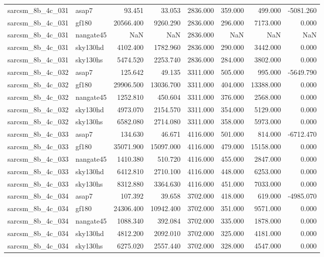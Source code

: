 \begin{tabular}{llrrrrrr}
sarcsm\_8b\_4c\_031 & asap7 & 93.451 & 33.053 & 2836.000 & 359.000 & 499.000 & -5081.260 \\
sarcsm\_8b\_4c\_031 & gf180 & 20566.400 & 9260.290 & 2836.000 & 296.000 & 7173.000 & 0.000 \\
sarcsm\_8b\_4c\_031 & nangate45 & NaN & NaN & 2836.000 & NaN & NaN & NaN \\
sarcsm\_8b\_4c\_031 & sky130hd & 4102.400 & 1782.960 & 2836.000 & 290.000 & 3442.000 & 0.000 \\
sarcsm\_8b\_4c\_031 & sky130hs & 5474.520 & 2253.740 & 2836.000 & 284.000 & 3802.000 & 0.000 \\
sarcsm\_8b\_4c\_032 & asap7 & 125.642 & 49.135 & 3311.000 & 505.000 & 995.000 & -5649.790 \\
sarcsm\_8b\_4c\_032 & gf180 & 29906.500 & 13036.700 & 3311.000 & 404.000 & 13388.000 & 0.000 \\
sarcsm\_8b\_4c\_032 & nangate45 & 1252.810 & 450.604 & 3311.000 & 376.000 & 2568.000 & 0.000 \\
sarcsm\_8b\_4c\_032 & sky130hd & 4973.070 & 2154.570 & 3311.000 & 354.000 & 5129.000 & 0.000 \\
sarcsm\_8b\_4c\_032 & sky130hs & 6582.080 & 2714.080 & 3311.000 & 358.000 & 5973.000 & 0.000 \\
sarcsm\_8b\_4c\_033 & asap7 & 134.630 & 46.671 & 4116.000 & 501.000 & 814.000 & -6712.470 \\
sarcsm\_8b\_4c\_033 & gf180 & 35071.900 & 15097.000 & 4116.000 & 479.000 & 15158.000 & 0.000 \\
sarcsm\_8b\_4c\_033 & nangate45 & 1410.380 & 510.720 & 4116.000 & 455.000 & 2847.000 & 0.000 \\
sarcsm\_8b\_4c\_033 & sky130hd & 6412.810 & 2710.100 & 4116.000 & 448.000 & 6253.000 & 0.000 \\
sarcsm\_8b\_4c\_033 & sky130hs & 8312.880 & 3364.630 & 4116.000 & 451.000 & 7033.000 & 0.000 \\
sarcsm\_8b\_4c\_034 & asap7 & 107.392 & 39.658 & 3702.000 & 418.000 & 619.000 & -4985.070 \\
sarcsm\_8b\_4c\_034 & gf180 & 24306.400 & 10942.400 & 3702.000 & 351.000 & 9571.000 & 0.000 \\
sarcsm\_8b\_4c\_034 & nangate45 & 1088.340 & 392.084 & 3702.000 & 335.000 & 1878.000 & 0.000 \\
sarcsm\_8b\_4c\_034 & sky130hd & 4812.200 & 2092.010 & 3702.000 & 325.000 & 4181.000 & 0.000 \\
sarcsm\_8b\_4c\_034 & sky130hs & 6275.020 & 2557.440 & 3702.000 & 328.000 & 4547.000 & 0.000 \\

\end{tabular}
